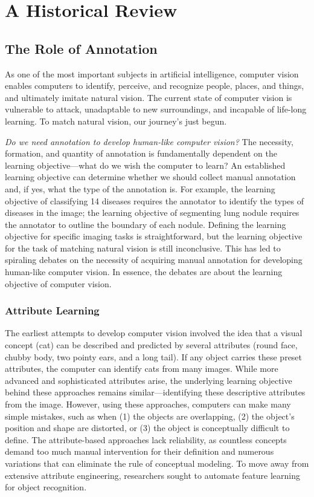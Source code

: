 \chapter{A Historical Review}
\label{ch2}

\section{The Role of Annotation}


As one of the most important subjects in artificial intelligence, computer vision enables computers to identify, perceive, and recognize people, places, and things, and ultimately imitate natural vision. The current state of computer vision is vulnerable to attack, unadaptable to new surroundings, and incapable of life-long learning. To match natural vision, our journey's just begun. 

\textit{Do we need annotation to develop human-like computer vision?} The necessity, formation, and quantity of annotation is fundamentally dependent on the learning objective---what do we wish the computer to learn?  An established learning objective can determine whether we should collect manual annotation and, if yes, what the type of the annotation is. For example, the learning objective of classifying 14 diseases requires the annotator to identify the types of diseases in the image; the learning objective of segmenting lung nodule requires the annotator to outline the boundary of each nodule. Defining the learning objective for specific imaging tasks is straightforward, but the learning objective for the task of matching natural vision is still inconclusive. This has led to spiraling debates on the necessity of acquiring manual annotation for developing human-like computer vision. In essence, the debates are about the learning objective of computer vision.

\subsection{Attribute Learning}

The earliest attempts to develop computer vision involved the idea that a visual concept (\eg cat) can be described and predicted by several attributes (\eg round face, chubby body, two pointy ears, and a long tail). If any object carries these preset attributes, the computer can identify cats from many images. While more advanced and sophisticated attributes arise, the underlying learning objective behind these approaches remains similar---identifying these descriptive attributes from the image. However, using these approaches, computers can make many simple mistakes, such as when (1) the objects are overlapping, (2) the object's position and shape are distorted, or (3) the object is conceptually difficult to define. The attribute-based approaches lack reliability, as countless concepts demand too much manual intervention for their definition and numerous variations that can eliminate the rule of conceptual modeling. To move away from extensive attribute engineering, researchers sought to automate feature learning for object recognition. 

